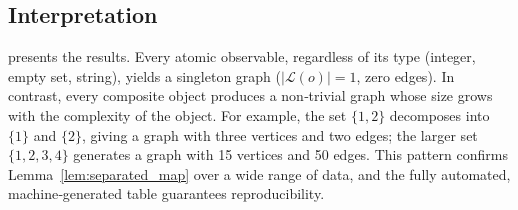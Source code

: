 \subsection{Interpretation}
 presents the results.
Every atomic observable, regardless of its type (integer, empty set, string), yields a singleton graph (\(\lvert\mathcal{L}(o)\rvert = 1\), zero edges).
In contrast, every composite object produces a non‑trivial graph whose size grows with the complexity of the object.
For example, the set \(\{1,2\}\) decomposes into \(\{1\}\) and \(\{2\}\), giving a graph with three vertices and two edges; the larger set \(\{1,2,3,4\}\) generates a graph with 15 vertices and 50 edges.
This pattern confirms Lemma~\ref{lem:separated_map} over a wide range of data, and the fully automated, machine‑generated table guarantees reproducibility.

\begin{table}[htbp]
\centering
\caption{Functor verification. An observable is \emph{Separated} if it is multi‑axially atomic. \(\vert\mathcal{D}(o)\vert\) is the number of vertices in \(\mathbf{D}(o)\).}
\label{tab:functor}

\end{table}
